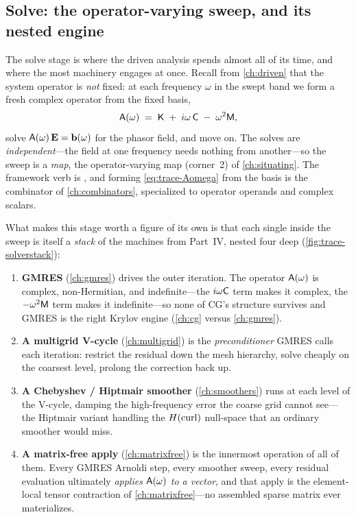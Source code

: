 \subsection{Solve: the operator-varying sweep, and its nested engine}
\label{sec:trace-solve}

The solve stage is where the driven analysis spends almost all of its time, and
where the most machinery engages at once. Recall from \cref{ch:driven} that the
system operator is \emph{not} fixed: at each frequency $\omega$ in the swept band
we form a fresh complex operator from the fixed basis,
\begin{equation}
  \mathsf{A}(\omega) \;=\; \mathsf{K} \;+\; i\omega\,\mathsf{C} \;-\; \omega^2\mathsf{M},
  \label{eq:trace-Aomega}
\end{equation}
solve $\mathsf{A}(\omega)\,\mathbf{E} = \mathbf{b}(\omega)$ for the phasor field, and move on. The
solves are \emph{independent}---the field at one frequency needs nothing from
another---so the sweep is a \emph{map}, the operator-varying map (corner~2) of
\cref{ch:situating}. The framework verb is , and forming
\cref{eq:trace-Aomega} from the basis is the  combinator
of \cref{ch:combinators}, specialized to operator operands and complex scalars.

What makes this stage worth a figure of its own is that each single
 inside the sweep is itself a \emph{stack} of the machines from
Part~IV, nested four deep (\cref{fig:trace-solverstack}):

\begin{enumerate}[nosep]
  \item \textbf{GMRES} (\cref{ch:gmres}) drives the outer iteration. The operator
  $\mathsf{A}(\omega)$ is complex, non-Hermitian, and indefinite---the $i\omega\mathsf{C}$
  term makes it complex, the $-\omega^2\mathsf{M}$ term makes it indefinite---so none of
  CG's structure survives and GMRES is the right Krylov engine (\cref{ch:cg}
  versus \cref{ch:gmres}).
  \item \textbf{A multigrid V-cycle} (\cref{ch:multigrid}) is the
  \emph{preconditioner} GMRES calls each iteration: restrict the residual down the
  mesh hierarchy, solve cheaply on the coarsest level, prolong the correction back
  up.
  \item \textbf{A Chebyshev / Hiptmair smoother} (\cref{ch:smoothers}) runs at
  each level of the V-cycle, damping the high-frequency error the coarse grid
  cannot see---the Hiptmair variant handling the $H(\mathrm{curl})$ null-space that an
  ordinary smoother would miss.
  \item \textbf{A matrix-free apply} (\cref{ch:matrixfree}) is the innermost
  operation of all of them. Every GMRES Arnoldi step, every smoother sweep, every
  residual evaluation ultimately \emph{applies $\mathsf{A}(\omega)$ to a vector}, and
  that apply is the element-local tensor contraction of \cref{ch:matrixfree}---no
  assembled sparse matrix ever materializes.
\end{enumerate}

